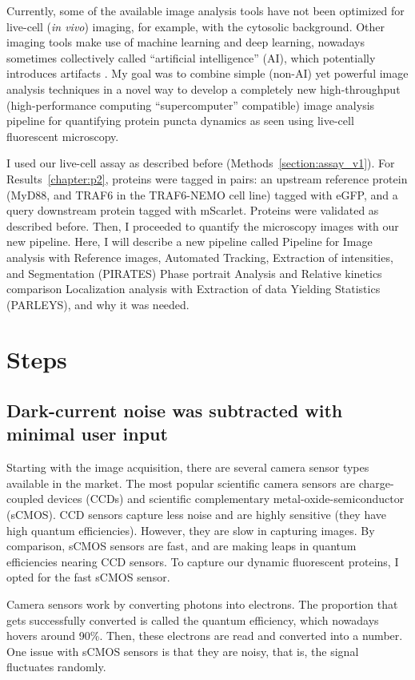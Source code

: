 Currently, some of the available image analysis tools have not been optimized for live-cell (\emph{in vivo}) imaging, for example, with the cytosolic background. Other imaging tools make use of machine learning and deep learning, nowadays sometimes collectively called “artificial intelligence” (AI), which potentially introduces artifacts \autocite{Krull_2019}. My goal was to combine simple (non-AI) yet powerful image analysis techniques in a novel way to develop a completely new high-throughput (high-performance computing “supercomputer” compatible) image analysis pipeline for quantifying protein puncta dynamics as seen using live-cell fluorescent microscopy.

I used our live-cell assay as described before (Methods~\ref{section:assay_v1}). For Results~\ref{chapter:p2}, proteins were tagged in pairs: an upstream reference protein (MyD88, and TRAF6 in the TRAF6-NEMO cell line) tagged with eGFP, and a query downstream protein tagged with mScarlet. Proteins were validated as described before. Then, I proceeded to quantify the microscopy images with our new pipeline. Here, I will describe a new pipeline called Pipeline for Image analysis with Reference images, Automated Tracking, Extraction of intensities, and Segmentation (PIRATES) Phase portrait Analysis and Relative kinetics comparison Localization analysis with Extraction of data Yielding Statistics (PARLEYS), and why it was needed.

\section{Steps}
\subsection{Dark-current noise was subtracted with minimal user input}
Starting with the image acquisition, there are several camera sensor types available in the market. The most popular scientific camera sensors are charge-coupled devices (CCDs) and scientific complementary metal-oxide-semiconductor (sCMOS). CCD sensors capture less noise and are highly sensitive (they have high quantum efficiencies). However, they are slow in capturing images. By comparison, sCMOS sensors are fast, and are making leaps in quantum efficiencies nearing CCD sensors. To capture our dynamic fluorescent proteins, I opted for the fast sCMOS sensor.

Camera sensors work by converting photons into electrons. The proportion that gets successfully converted is called the quantum efficiency, which nowadays hovers around 90\%. Then, these electrons are read and converted into a number. One issue with sCMOS sensors is that they are noisy, that is, the signal fluctuates randomly. 

